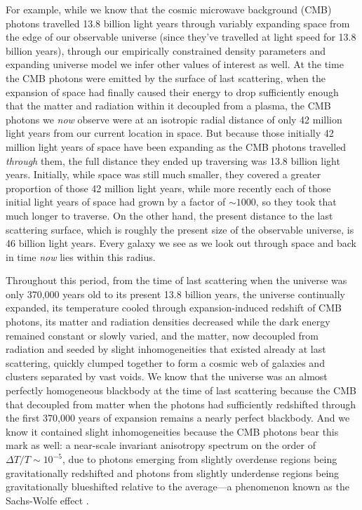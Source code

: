 \documentclass[12pt]{book}
\begin{document}
For example, while we know that the cosmic microwave background (CMB) photons travelled 13.8 billion light years through variably expanding space from the edge of our observable universe (since they've travelled at light speed for 13.8 billion years), through our empirically constrained density parameters and expanding universe model we infer other values of interest as well. At the time the CMB photons were emitted by the surface of last scattering, when the expansion of space had finally caused their energy to drop sufficiently enough that the matter and radiation within it decoupled from a plasma, the CMB photons we \textit{now} observe were at an isotropic radial distance of only 42 million light years from our current location in space. But because those initially 42 million light years of space have been expanding as the CMB photons travelled \textit{through} them, the full distance they ended up traversing was 13.8 billion light years. Initially, while space was still much smaller, they covered a greater proportion of those 42 million light years, while more recently each of those initial light years of space had grown by a factor of $\sim1000$, so they took that much longer to traverse. On the other hand, the present distance to the last scattering surface, which is roughly the present size of the observable universe, is 46 billion light years. Every galaxy we see as we look out through space and back in time \textit{now} lies within this radius.

Throughout this period, from the time of last scattering when the universe was only 370,000 years old to its present 13.8 billion years, the universe continually expanded, its temperature cooled through expansion-induced redshift of CMB photons, its matter and radiation densities decreased while the dark energy remained constant or slowly varied, and the matter, now decoupled from radiation and seeded by slight inhomogeneities that existed already at last scattering, quickly clumped together to form a cosmic web of galaxies and clusters separated by vast voids. We know that the universe was an almost perfectly homogeneous blackbody at the time of last scattering because the CMB that decoupled from matter when the photons had sufficiently redshifted through the first 370,000 years of expansion remains a nearly perfect blackbody. And we know it contained slight inhomogeneities because the CMB photons bear this mark as well: a near-scale invariant anisotropy spectrum on the order of $\Delta T/T\sim10^{-5}$, due to photons emerging from slightly overdense regions being gravitationally redshifted and photons from slightly underdense regions being gravitationally blueshifted relative to the average---a phenomenon known as the Sachs-Wolfe effect \citep{Sachs1967}.
\end{document}
